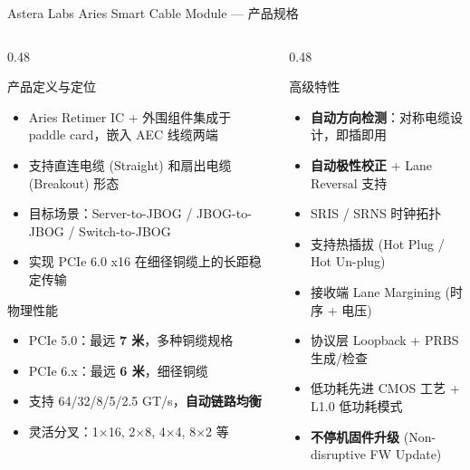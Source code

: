 \documentclass[aspectratio=169, 10pt, UTF8]{ctexbeamer}
\begin{document}
\begin{frame}{Astera Labs Aries Smart Cable Module — 产品规格}
  \centering
  \scriptsize
  \begin{columns}[T]
    \begin{column}{0.48\textwidth}
      \begin{block}{产品定义与定位}
        \begin{itemize}
          \item Aries Retimer IC + 外围组件集成于 paddle card，嵌入 AEC 线缆两端
          \item 支持直连电缆 (Straight) 和扇出电缆 (Breakout) 形态
          \item 目标场景：Server-to-JBOG / JBOG-to-JBOG / Switch-to-JBOG
          \item 实现 PCIe 6.0 x16 在细径铜缆上的长距稳定传输
        \end{itemize}
      \end{block}
      \vspace{-10pt}
      \begin{alertblock}{物理性能}
        \begin{itemize}
          \item PCIe 5.0：最远 \textbf{7 米}，多种铜缆规格
          \item PCIe 6.x：最远 \textbf{6 米}，细径铜缆
          \item 支持 64/32/8/5/2.5 GT/s，\textbf{自动链路均衡}
          \item 灵活分叉：1×16, 2×8, 4×4, 8×2 等
        \end{itemize}
      \end{alertblock}
    \end{column}
    \begin{column}{0.48\textwidth}
      \begin{exampleblock}{高级特性}
        \begin{itemize}
          \item \textbf{自动方向检测}：对称电缆设计，即插即用
          \item \textbf{自动极性校正} + Lane Reversal 支持
          \item SRIS / SRNS 时钟拓扑
          \item 支持热插拔 (Hot Plug / Hot Un-plug)
          \item 接收端 Lane Margining (时序 + 电压)
          \item 协议层 Loopback + PRBS 生成/检查
          \item 低功耗先进 CMOS 工艺 + L1.0 低功耗模式
          \item \textbf{不停机固件升级} (Non-disruptive FW Update)
        \end{itemize}
      \end{exampleblock}
    \end{column}
  \end{columns}


\end{frame}
\end{document}
